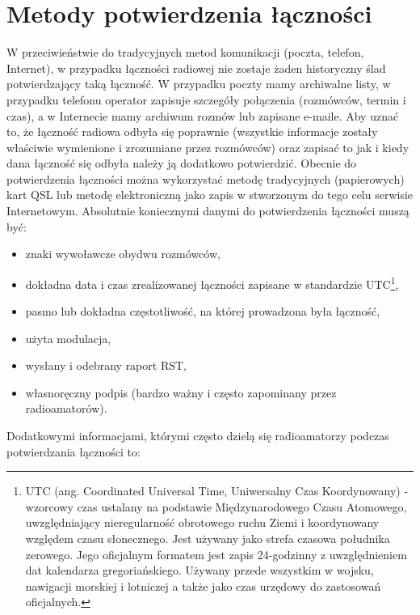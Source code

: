 \documentclass[]{mgr}
\begin{document}
        \section{Metody potwierdzenia łączności}
        W przeciwieństwie do tradycyjnych metod komunikacji (poczta, telefon, Internet), w przypadku łączności radiowej nie zostaje żaden historyczny ślad potwierdzający taką łączność. W przypadku poczty mamy archiwalne listy, w przypadku telefonu operator zapisuje szczegóły połączenia (rozmówców, termin i czas), a w Internecie mamy archiwum rozmów lub zapisane e-maile.
        Aby uznać to, że łączność radiowa odbyła się poprawnie (wszystkie informacje zostały właściwie wymienione i zrozumiane przez rozmówców) oraz zapisać to jak i kiedy dana łączność się odbyła należy ją dodatkowo potwierdzić. Obecnie do potwierdzenia łączności można wykorzystać metodę tradycyjnych (papierowych) kart QSL lub metodę elektroniczną jako zapis w stworzonym do tego celu serwisie Internetowym.
        Absolutnie koniecznymi danymi do potwierdzenia łączności muszą być:
        \begin{itemize}
            \item znaki wywoławcze obydwu rozmówców,
            \item dokładna data i czas zrealizowanej łączności zapisane w standardzie UTC\footnote{UTC (ang. Coordinated Universal Time, Uniwersalny Czas Koordynowany) - wzorcowy czas ustalany na podstawie Międzynarodowego Czasu Atomowego, uwzględniający nieregularność obrotowego ruchu Ziemi i koordynowany względem czasu słonecznego. Jest używany jako strefa czasowa południka zerowego. Jego oficjalnym formatem jest zapis 24-godzinny z uwzględnieniem dat kalendarza gregoriańskiego. Używany przede wszystkim w wojsku, nawigacji morskiej i lotniczej a także jako czas urzędowy do zastosowań oficjalnych.},
            \item pasmo lub dokładna częstotliwość, na której prowadzona była łączność,
            \item użyta modulacja,
            \item wysłany i odebrany raport RST,
            \item własnoręczny podpis (bardzo ważny i często zapominany przez radioamatorów).
        \end{itemize}
        Dodatkowymi informacjami, którymi często dzielą się radioamatorzy podczas potwierdzania łączności to:
\end{document}
